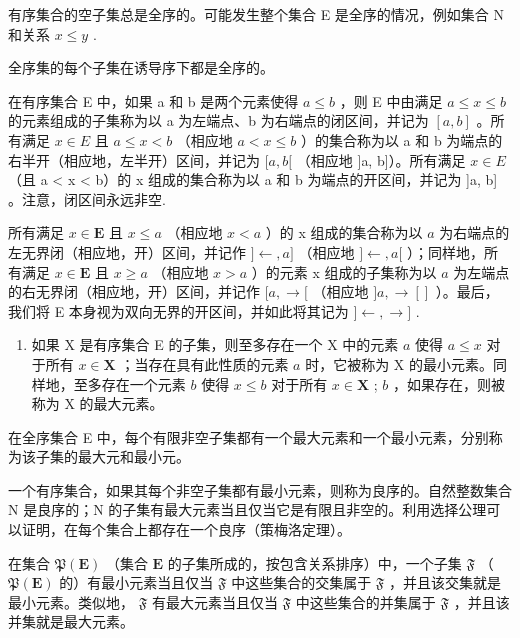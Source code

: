 有序集合的空子集总是全序的。可能发生整个集合 E 是全序的情况，例如集合 N 和关系 \(x \leqslant y\) .

全序集的每个子集在诱导序下都是全序的。

在有序集合 E 中，如果 a 和 b 是两个元素使得 \(a \leqslant b\) ，则 E 中由满足 \(a \leqslant x \leqslant b\) 的元素组成的子集称为以 a 为左端点、b 为右端点的闭区间，并记为 \([a, b]\) 。所有满足 \(x \in E\) 且 \(a \leqslant x < b\) （相应地 \(a < x \leqslant b\) ）的集合称为以 a 和 b 为端点的右半开（相应地，左半开）区间，并记为 \([a, b[\) （相应地 {]}a, b{]}）。所有满足 \(x \in E\) （且 a \textless{} x \textless{} b）的 x 组成的集合称为以 a 和 b 为端点的开区间，并记为 {]}a, b{]} 。注意，闭区间永远非空.

所有满足 \(x \in \mathbf{E}\) 且 \(x \leqslant a\) （相应地 \(x < a\) ）的 x 组成的集合称为以 \(a\) 为右端点的左无界闭（相应地，开）区间，并记作 \(] \leftarrow, a]\) （相应地 \(] \leftarrow, a[\) ）；同样地，所有满足 \(x \in \mathbf{E}\) 且 \(x \geqslant a\) （相应地 \(x > a\) ）的元素 x 组成的子集称为以 \(a\) 为左端点的右无界闭（相应地，开）区间，并记作 \([a, \rightarrow[\) （相应地 \(]a, \rightarrow[]\) ）。最后，我们将 E 本身视为双向无界的开区间，并如此将其记为 \(] \leftarrow, \rightarrow]\) .

\begin{enumerate}
\def\labelenumi{\arabic{enumi}.}
\setcounter{enumi}{4}
\tightlist
\item
  如果 X 是有序集合 E 的子集，则至多存在一个 X 中的元素 \(a\) 使得 \(a \leqslant x\) 对于所有 \(x \in \mathbf{X}\) ；当存在具有此性质的元素 \(a\) 时，它被称为 X 的最小元素。同样地，至多存在一个元素 \(b\) 使得 \(x \leqslant b\) 对于所有 \(x \in \mathbf{X}\) ; \(b\) ，如果存在，则被称为 X 的最大元素。
\end{enumerate}

在全序集合 E 中，每个有限非空子集都有一个最大元素和一个最小元素，分别称为该子集的最大元和最小元。

一个有序集合，如果其每个非空子集都有最小元素，则称为良序的。自然整数集合 N 是良序的；N 的子集有最大元素当且仅当它是有限且非空的。利用选择公理可以证明，在每个集合上都存在一个良序（策梅洛定理）。

在集合 \(\mathfrak{P}(\mathbf{E})\) （集合 \(\mathbf{E}\) 的子集所成的，按包含关系排序）中，一个子集 \(\mathfrak{F}\) （ \(\mathfrak{P}(\mathbf{E})\) 的）有最小元素当且仅当 \(\mathfrak{F}\) 中这些集合的交集属于 \(\mathfrak{F}\) ，并且该交集就是最小元素。类似地， \(\mathfrak{F}\) 有最大元素当且仅当 \(\mathfrak{F}\) 中这些集合的并集属于 \(\mathfrak{F}\) ，并且该并集就是最大元素。

